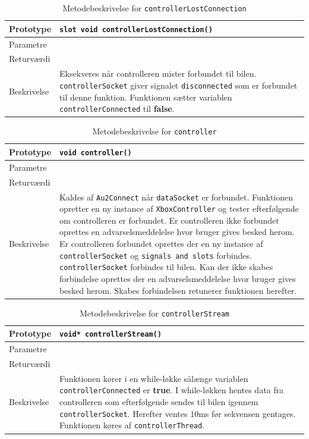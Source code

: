 \begin{table}[H]
\begin{tabularx}{\textwidth}{| l | Z |} \hline
Prototype & \texttt{slot void controllerLostConnection()} \\\hline
Parametre &   \\\hline
Returværdi &  \\\hline
Beskrivelse & Eksekveres når controlleren mister forbundet til bilen. \texttt{controllerSocket} giver signalet \texttt{disconnected} som er forbundet til denne funktion. Funktionen sætter variablen \texttt{controllerConnected} til \textbf{false}.   \\\hline
\end{tabularx}
\caption{Metodebeskrivelse for \texttt{controllerLostConnection}}
\label{table:met_ccontrollerLostConnection}
\end{table}

\begin{table}[H]
\begin{tabularx}{\textwidth}{| l | Z |} \hline
Prototype & \texttt{void controller()} \\\hline
Parametre &   \\\hline
Returværdi &  \\\hline
Beskrivelse & Kaldes af \texttt{Au2Connect} når \texttt{dataSocket} er forbundet. Funktionen opretter en ny instance af \texttt{XboxController} og tester efterfølgende om controlleren er forbundet. Er controlleren ikke forbundet oprettes en advarselsmeddelelse hvor bruger gives besked herom. Er controlleren forbundet oprettes der en ny instance af \texttt{controllerSocket} og \texttt{signals and slots} forbindes. \texttt{controllerSocket} forbindes til bilen. Kan der ikke skabes forbindelse oprettes der en advarselsmeddelelse hvor bruger gives besked herom. Skabes forbindelsen retunerer funktionen herefter.  \\\hline
\end{tabularx}
\caption{Metodebeskrivelse for \texttt{controller}}
\label{table:met_controller}
\end{table}

\clearpage

\begin{table}[H]
\begin{tabularx}{\textwidth}{| l | Z |} \hline
Prototype & \texttt{void* controllerStream()} \\\hline
Parametre &   \\\hline
Returværdi &  \\\hline
Beskrivelse & Funktionen kører i en while-løkke sålænge variablen \texttt{controllerConnected} er \textbf{true}. I while-løkken hentes data fra controlleren som efterfølgende sendes til bilen igennem \texttt{controllerSocket}. Herefter ventes 10ms før sekvensen gentages. Funktionen køres af \texttt{controllerThread}.\\\hline
\end{tabularx}
\caption{Metodebeskrivelse for \texttt{controllerStream}}
\label{table:met_controllerStream}
\end{table}

